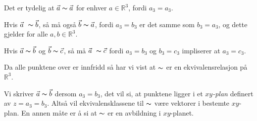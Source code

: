 \documentclass[a4paper,norsk,twocolumn,12pt]{article}
\begin{document}
Det er tydelig at $\vec{a} \thicksim \vec{a}$ for enhver $a\in \mathbb{R}^3$,
fordi $a_3=a_3$.

Hvis $\vec{a} \thicksim \vec{b}$, så må også $\vec{b} \thicksim \vec{a}$, fordi
$a_3=b_3$ er det samme som $b_3=a_3$, og dette gjelder for alle $a,b \in
\mathbb{R}^3$.

Hvis $\vec{a} \thicksim \vec{b}$ og $\vec{b} \thicksim \vec{c}$, så må
$\vec{a} \thicksim \vec{c}$ fordi $a_3=b_3$ og $b_3=c_3$ impliserer at
$a_3=c_3$.

Da alle punktene over er innfridd så har vi vist at $\thicksim$ er en
ekvivalensrelasjon på $\mathbb{R}^3$.


Vi skriver $\vec{a} \thicksim \vec{b}$ dersom $a_3 = b_3$, det vil si, at punktene
ligger i et \textit{$xy$-plan} definert av $z=a_3=b_3$. Altså vil
ekvivalensklassene til $\thicksim$ være vektorer i bestemte $xy$-plan. En annen
måte er å si at $\thicksim$ er en avbildning i $xy$-planet.
\end{document}
